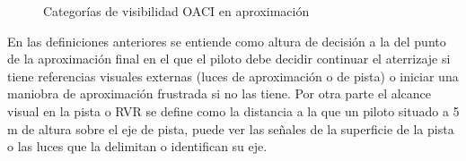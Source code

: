 \begin{figure}[!htb]

    \caption[06.ILS.categorias.visibilidad]{Categorías de visibilidad OACI en aproximación}
  \label{fig:06.ILS.categoriasAproximacion}
\end{figure}




En las definiciones anteriores se entiende como altura de decisión a la del punto de la aproximación
final en el que el piloto debe decidir continuar el aterrizaje si tiene referencias visuales externas (luces
de aproximación o de pista) o iniciar una maniobra de aproximación frustrada si no las tiene. Por
otra parte el alcance visual en la pista o RVR se define como la distancia a la que un piloto situado
a 5 m de altura sobre el eje de pista, puede ver las señales de la superficie de la pista o las luces que
la delimitan o identifican su eje.



